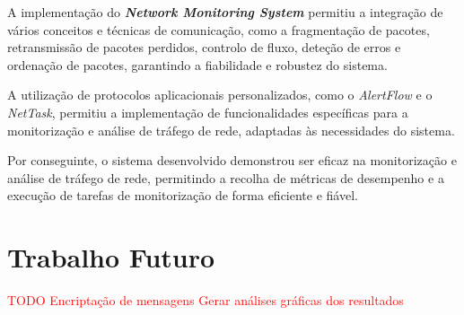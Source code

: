 \documentclass[a4paper,12pt]{scrreprt}
\begin{document}
A implementação do \textbf{\textit{Network Monitoring System}} permitiu a integração de
vários conceitos e técnicas de comunicação, como a fragmentação de pacotes, retransmissão
de pacotes perdidos, controlo de fluxo, deteção de erros e ordenação de pacotes, garantindo
a fiabilidade e robustez do sistema.

A utilização de protocolos aplicacionais personalizados, como o \textit{AlertFlow} e o
\textit{NetTask}, permitiu a implementação de funcionalidades específicas para a
monitorização e análise de tráfego de rede, adaptadas às necessidades do sistema.


Por conseguinte, o sistema desenvolvido demonstrou ser eficaz na monitorização e
análise de tráfego de rede, permitindo a recolha de métricas de
desempenho e a execução de tarefas de monitorização de forma eficiente e fiável.

\section{Trabalho Futuro}

\textcolor{red}{
    TODO
    Encriptação de mensagens
    Gerar análises gráficas dos resultados
}



%
%
%
%
%



%

\end{document}

